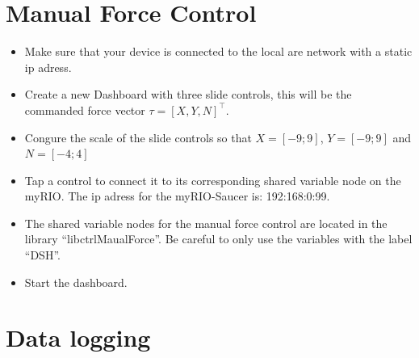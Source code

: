 \documentclass[a4paper,twoside,english]{report}
\begin{document}
\section{Manual Force Control}
\begin{itemize}
\item Make sure that your device is connected to the local are network with
a static ip adress.
\item Create a new Dashboard with three slide controls, this will be the
commanded force vector $\tau=\left[X,Y,N\right]^{\top}$.
\item Congure the scale of the slide controls so that $X=\left[-9;9\right]$,
$Y=\left[-9;9\right]$ and $N=\left[-4;4\right]$
\item Tap a control to connect it to its corresponding shared variable node
on the myRIO. The ip adress for the myRIO-Saucer is: 192:168:0:99.
\item The shared variable nodes for the manual force control are located
in the library ``libctrlMaualForce''. Be careful to only use the
variables with the label ``DSH''.
\item Start the dashboard.
\end{itemize}

\section{Data logging}
\end{document}
